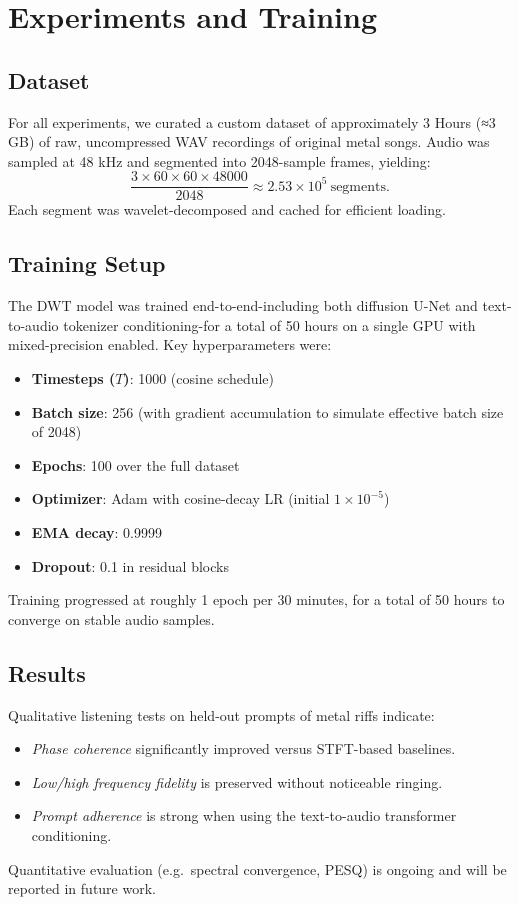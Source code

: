 \documentclass[12pt]{report}
\begin{document}
\chapter{Experiments and Training}

\section{Dataset}
For all experiments, we curated a custom dataset of approximately 3 Hours (≈3 GB) of raw, uncompressed WAV recordings of original metal songs. Audio was sampled at 48 kHz and segmented into 2048-sample frames, yielding:
\[
\frac{3 \times 60 \times 60 \times 48000}{2048} \approx 2.53\times10^5\ \text{segments}.
\]
Each segment was wavelet-decomposed and cached for efficient loading.

\section{Training Setup}
The DWT model was trained end-to-end-including both diffusion U-Net and text-to-audio tokenizer conditioning-for a total of 50 hours on a single GPU with mixed-precision enabled. Key hyperparameters were:
\begin{itemize}
  \item \textbf{Timesteps ($T$)}: 1000 (cosine schedule)
  \item \textbf{Batch size}: 256 (with gradient accumulation to simulate effective batch size of 2048)
  \item \textbf{Epochs}: 100 over the full dataset
  \item \textbf{Optimizer}: Adam with cosine-decay LR (initial $1\times10^{-5}$)
  \item \textbf{EMA decay}: 0.9999
  \item \textbf{Dropout}: 0.1 in residual blocks
\end{itemize}
Training progressed at roughly 1 epoch per 30 minutes, for a total of 50 hours to converge on stable audio samples.

\section{Results}
Qualitative listening tests on held-out prompts of metal riffs indicate:
\begin{itemize}
  \item \emph{Phase coherence} significantly improved versus STFT-based baselines.
  \item \emph{Low/high frequency fidelity} is preserved without noticeable ringing.
  \item \emph{Prompt adherence} is strong when using the text-to-audio transformer conditioning.
\end{itemize}
Quantitative evaluation (e.g.\ spectral convergence, PESQ) is ongoing and will be reported in future work.
\end{document}
